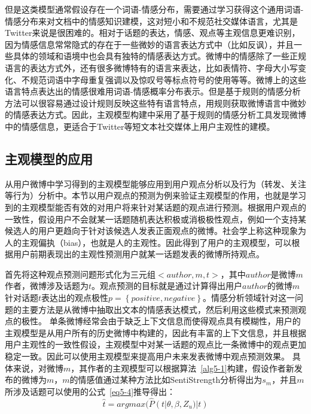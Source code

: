 但是这类模型通常假设存在一个词语-情感分布，需要通过学习获得这个通用词语-情感分布来对文档中的情感知识建模，这对短小和不规范社交媒体语言，尤其是Twitter来说是很困难的。相对于话题的表达，情感、观点等主观信息更难识别，因为情感信息常常隐式的存在于一些微妙的语言表达方式中（比如反讽），并且一些具体的领域和语境中也会具有独特的情感表达方式。微博中的情感除了一些正规语言的表达方式外，还有很多微博特有的语言来表达，比如表情符、字母大小写变化、不规范词语中字母重复强调以及惊叹号等标点符号的使用等等。微博上的这些语言特点表达出的情感很难用词语-情感概率分布表示。但是基于规则的情感分析方法可以很容易通过设计规则反映这些特有语言特点，用规则获取微博语言中微妙的情感表达方式。因此，主观模型构建中采用了基于规则的情感分析工具发现微博中的情感信息，更适合于Twitter等短文本社交媒体上用户主观性的建模。

\subsection{主观模型的应用}
\label{application}
从用户微博中学习得到的主观模型能够应用到用户观点分析以及行为（转发、关注等行为）分析中。本节以用户观点的预测为例来验证主观模型的作用，也就是学习到的主观模型能否有效的对用户将来针对某话题的观点进行预测。根据用户观点的一致性，假设用户不会就某一话题随机表达积极或消极极性观点，例如一个支持某候选人的用户更趋向于针对该候选人发表正面观点的微博。社会学上称这种现象为人的主观偏执（bias），也就是人的主观性。因此得到了用户的主观模型，可以根据用户前期表现出的主观性预测用户就某一话题发表的微博所持观点。

首先将这种观点预测问题形式化为三元组$ < author, m, t >$，其中$author$是微博$ m $作者，微博涉及话题为$ t $。观点预测的目标就是通过计算得出用户$author$的微博$ m $针对话题$ t $表达出的观点极性$ p=\left\{positive,negative\right\} $。情感分析领域针对这一问题的主要方法是从微博中抽取出文本的情感表达模式，然后利用这些模式来预测观点的极性。
单条微博经常会由于缺乏上下文信息而使得观点具有模糊性，用户的主观模型是从用户所有的历史微博中构建的，因此有丰富的上下文信息，并且根据用户主观性的一致性假设，主观模型中对某一话题的观点比一条微博中的观点更加稳定一致。因此可以使用主观模型来提高用户未来发表微博中观点预测效果。
具体来说，对微博$ m $，其作者的主观模型可以根据算法~\ref{alg5-1}构建，假设作者新发布的微博为$ m $，$ m $的情感值通过某种方法比如SentiStrength分析得出为$s_m$，并且$ m $所涉及话题可以使用的公式~\ref{eq5-4}推导得出：
\begin{equation}
\label{eq5-4}
\hat{t}=argmax(\hat{P}(t| \theta,\beta ,Z_{u})|t)
\end{equation}

